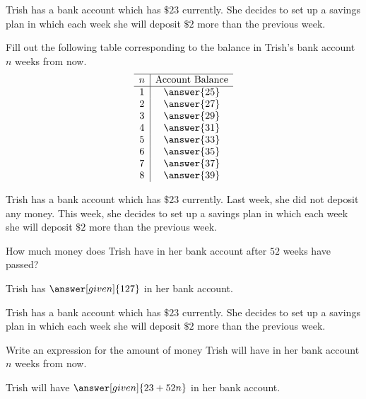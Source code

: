 \documentclass[nooutcomes]{ximera}
\begin{document}
\begin{problem}
Trish has a bank account which has $\$23$ currently.  She decides to set up a savings plan in which each week she will deposit $\$2$ more than the previous week.

Fill out the following table corresponding to the balance in Trish's bank account $n$ weeks from now.
\[
\begin{array}{c|c} \hline
n & \text{Account Balance} \\ \hline
1 & \answer{25} \\
2 & \answer{27} \\
3 & \answer{29}\\
4 & \answer{31}\\
5 & \answer{33}\\
6 & \answer{35}\\
7 & \answer{37}\\
8 & \answer{39}\\
\end{array}
\]
\end{problem}



\begin{problem}
Trish has a bank account which has $\$23$ currently.  Last week, she did not deposit any money.  This week, she decides to set up a savings plan in which each week she will deposit $\$2$ more than the previous week.

How much money does Trish have in her bank account after $52$ weeks have passed?

\begin{prompt}
Trish has $\answer[given]{127}$ in her bank account.
\end{prompt}
\end{problem}




\begin{problem}
Trish has a bank account which has $\$23$ currently.  She decides to set up a savings plan in which each week she will deposit $\$2$ more than the previous week.

Write an expression for the amount of money Trish will have in her bank account $n$ weeks from now.

\begin{prompt}
Trish will have $\answer[given]{23+52n}$ in her bank account.
\end{prompt}
\end{problem}
\end{document}

